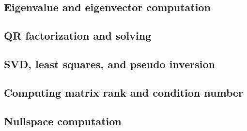 \documentclass[11pt, letterpaper]{article}
\begin{document}
\subsection{Eigenvalue and eigenvector computation}

\subsection{QR factorization and solving}

\subsection{SVD, least squares, and pseudo inversion}

\subsection{Computing matrix rank and condition number}

\subsection{Nullspace computation}
\end{document}
